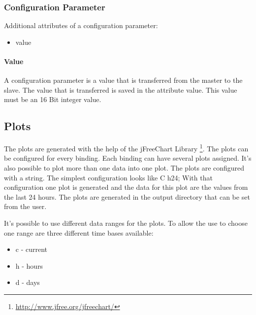 \subsubsection{Configuration Parameter} %
\label{ssub:configuration_parameter}
Additional attributes of a configuration parameter:
\begin{itemize}
    \item value
\end{itemize}

\paragraph{Value} %
\label{par:value}
A configuration parameter is a value that is transferred from the master to the slave. The value that is transferred is saved in the attribute value. This value must be an 16 Bit integer value.


\subsection{Plots} %
\label{sub:plots}
The plots are generated with the help of the jFreeChart Library \footnote{\url{http://www.jfree.org/jfreechart/}}.
The plots can be configured for every binding. Each binding can have several plots assigned. It's also possible to plot more than one data into one plot. The plots are configured with a string. The simplest configuration looks like {C h24;} With that configuration one plot is generated and the data for this plot are the values from the last 24 hours. The plots are generated in the output directory that can be set from the user.

It's possible to use different data ranges for the plots. To allow the use to choose one range are three different time bases available:
\begin{itemize}
	\item c - current
	\item h - hours
	\item d - days
\end{itemize}

